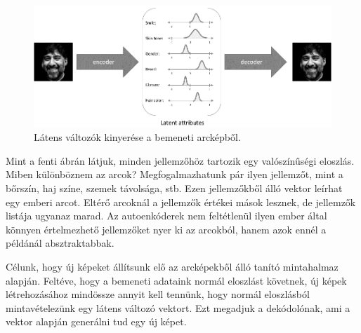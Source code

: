 
\begin{figure}[ht]
	\centering
	\includegraphics[width=1\columnwidth]{figures/autoenc_latent.png}
	\caption{Látens változók kinyerése a bemeneti arcképből.}
	\label{fig:vae_face}
\end{figure}

Mint a fenti ábrán látjuk, minden jellemzőhöz tartozik egy valószínűségi eloszlás. Miben különböznem az arcok? Megfogalmazhatunk pár ilyen jellemzőt, mint a bőrszín, haj színe, szemek távolsága, stb. Ezen jellemzőkből álló vektor leírhat egy emberi arcot. Eltérő arcoknál a jellemzők értékei mások lesznek, de jellemzők listája ugyanaz marad. Az autoenkóderek nem feltétlenül ilyen ember által könnyen értelmezhető jellemzőket nyer ki az arcokból, hanem azok ennél a példánál absztraktabbak.

Célunk, hogy új képeket állítsunk elő az arcképekből álló tanító mintahalmaz alapján. Feltéve, hogy a bemeneti adataink normál eloszlást követnek, új képek létrehozásához mindössze annyit kell tennünk, hogy normál eloszlásból mintavételezünk egy látens változó vektort. Ezt megadjuk a dekódolónak, ami a vektor alapján generálni tud egy új képet.



